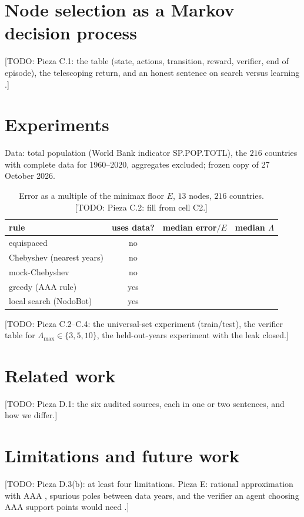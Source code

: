\documentclass[11pt]{article}
\newcommand{\todo}[1]{\textcolor{red!70!black}{[TODO: #1]}}
\begin{document}
\section{Node selection as a Markov decision process}\label{sec:mdp}
\todo{Pieza C.1: the table (state, actions, transition, reward, verifier, end of episode), the telescoping return, and an honest sentence on search versus learning \cite{suttonbarto2018}.}

\section{Experiments}\label{sec:exp}
Data: total population (World Bank indicator SP.POP.TOTL), the $216$ countries with complete data for 1960--2020, aggregates excluded; frozen copy of 27 October 2026.

\begin{table}[h]\centering
\caption{Error as a multiple of the minimax floor $E$, $13$ nodes, $216$ countries. \todo{Pieza C.2: fill from cell C2.}}
\begin{tabular}{lccc}\toprule
rule & uses data? & median error$/E$ & median $\Lambda$\\\midrule
equispaced & no & & \\
Chebyshev (nearest years) & no & & \\
mock-Chebyshev & no & & \\
greedy (AAA rule) & yes & & \\
local search (NodoBot) & yes & & \\\bottomrule
\end{tabular}\end{table}

\todo{Pieza C.2--C.4: the universal-set experiment (train/test), the verifier table for $\Lambda_{\max}\in\{3,5,10\}$, the held-out-years experiment with the leak closed.}

\section{Related work}
\todo{Pieza D.1: the six audited sources, each in one or two sentences, and how we differ.}

\section{Limitations and future work}
\todo{Pieza D.3(b): at least four limitations. Pieza E: rational approximation with AAA \cite{aaa2018,nt2026}, spurious poles between data years, and the verifier an agent choosing AAA support points would need \cite{gilleswilber2026}.}
\end{document}
